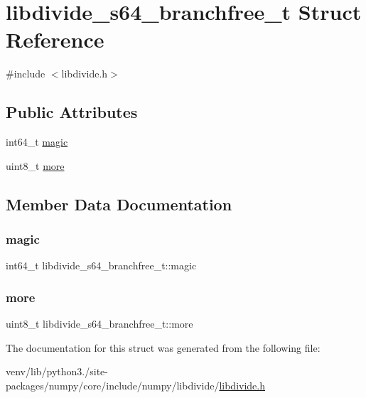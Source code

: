 \hypertarget{structlibdivide__s64__branchfree__t}{}\section{libdivide\+\_\+s64\+\_\+branchfree\+\_\+t Struct Reference}
\label{structlibdivide__s64__branchfree__t}


{\ttfamily \#include $<$libdivide.\+h$>$}

\subsection*{Public Attributes}
\begin{DoxyCompactItemize}
\item 
int64\+\_\+t \hyperlink{structlibdivide__s64__branchfree__t_a628ecf63bfe51d8af4d0799d37ca8466}{magic}
\item 
uint8\+\_\+t \hyperlink{structlibdivide__s64__branchfree__t_af090aef1b822ad3a5bf89a3460492e28}{more}
\end{DoxyCompactItemize}


\subsection{Member Data Documentation}
\mbox{\label{structlibdivide__s64__branchfree__t_a628ecf63bfe51d8af4d0799d37ca8466}} 
\subsubsection{\texorpdfstring{magic}{magic}}
{\footnotesize\ttfamily int64\+\_\+t libdivide\+\_\+s64\+\_\+branchfree\+\_\+t\+::magic}

\mbox{\label{structlibdivide__s64__branchfree__t_af090aef1b822ad3a5bf89a3460492e28}} 
\subsubsection{\texorpdfstring{more}{more}}
{\footnotesize\ttfamily uint8\+\_\+t libdivide\+\_\+s64\+\_\+branchfree\+\_\+t\+::more}



The documentation for this struct was generated from the following file\+:\begin{DoxyCompactItemize}
\item 
venv/lib/python3./site-\/packages/numpy/core/include/numpy/libdivide/\hyperlink{libdivide_8h}{libdivide.\+h}\end{DoxyCompactItemize}
